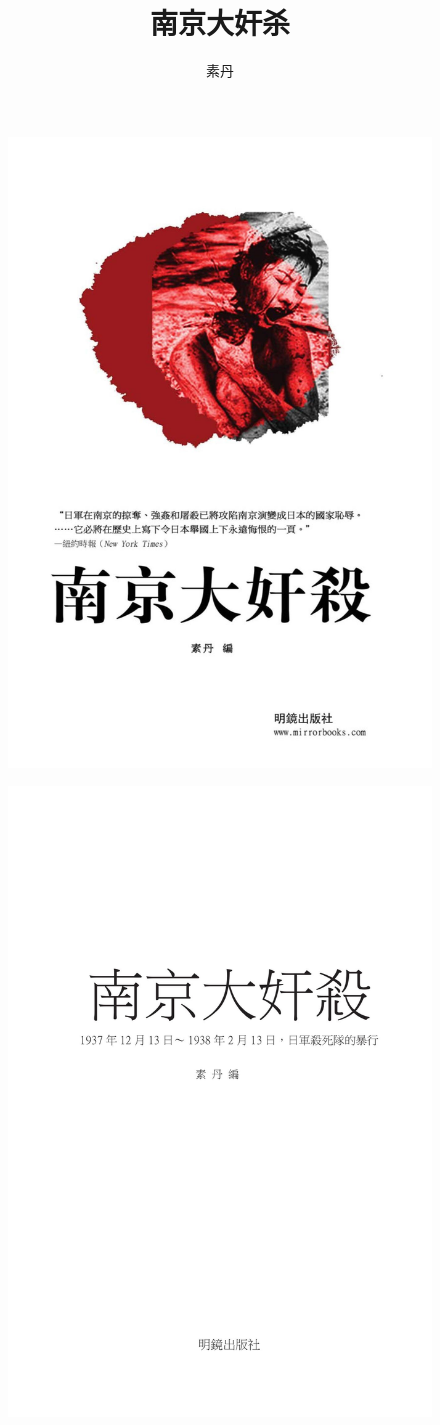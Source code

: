 \documentclass[12pt,UTF8]{ctexbook}
\title{\heiti\zihao{0} 南京大奸杀}
\author{素丹}
\date{}
\begin{document}
\maketitle
\tableofcontents

\frontmatter

\begin{figure}[htbp]
	\centering
	\includegraphics[width=0.7\linewidth]{cover}
	\caption{}
	\label{fig:1}
\end{figure}

\begin{figure}[htbp]
	\centering
	\includegraphics[width=0.7\linewidth]{cover1}
	\caption{}
	\label{fig:1}
\end{figure}
\end{document}
